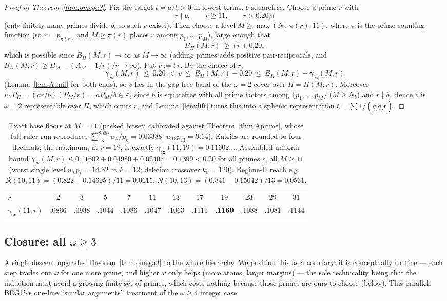 \documentclass[11pt]{amsart}
\theoremstyle{plain}
\theoremstyle{definition}
\newcommand{\Z}{\mathbb{Z}}
\begin{document}
\begin{proof}[Proof of Theorem~\ref{thm:omega3}]
Fix the target $t=a/b>0$ in lowest terms, $b$ squarefree.  Choose a prime $r$ with
\[
  r\nmid b,\qquad r\ge11,\qquad r>0.20/t
\]
(only finitely many primes divide $b$, so such $r$ exists).  Then choose a level
$M\ge\max(N_b,\pi(r),11)$, where $\pi$ is the prime-counting function (so
$r=p_{\pi(r)}$ and $M\ge\pi(r)$ places $r$ among $p_1,\dots,p_M$), large enough that
\[
  B_\Pi(M,r)\ \ge\ t\,r+0.20 ,
\]
which is possible since $B_\Pi(M,r)\to\infty$ as $M\to\infty$ (adding primes adds
positive pair-reciprocals, and $B_\Pi(M,r)\ge B_M-(A_M-1/r)/r\to\infty$).  Put
$v:=t\,r$.  By the choice of $r$,
\[
  \gamma_{\mathrm{ex}}(M,r)\ \le\ 0.20\ <\ v\ \le\ B_\Pi(M,r)-0.20
  \ \le\ B_\Pi(M,r)-\gamma_{\mathrm{ex}}(M,r)
\]
(Lemma~\ref{lem:Aunif} for both ends), so $v$ lies in the gap-free band of the
$\omega=2$ cover over $\Pi=\Pi(M,r)$.  Moreover $v\cdot P_\Pi=(ar/b)(P_M/r)
=aP_M/b\in\Z$, since $b$ is squarefree with all prime factors among
$\{p_1,\dots,p_M\}$ ($M\ge N_b$) and $r\nmid b$.  Hence $v$ is $\omega=2$
representable over $\Pi$, which omits $r$, and Lemma~\ref{lem:lift} turns this
into a sphenic representation $t=\sum1/(q_iq_jr)$.
\end{proof}

\begin{table}[h]
\centering
\small
\begin{tabular}{l|ccccccccccc}
\hline
$r$ & $2$ & $3$ & $5$ & $7$ & $11$ & $13$ & $17$ & $19$ & $23$ & $29$ & $31$\\
$\gamma_{\mathrm{ex}}(11,r)$ & .0866 & .0938 & .1044 & .1086 & .1047 & .1063 & .1111 & \textbf{.1160} & .1088 & .1081 & .1144\\
\hline
\end{tabular}
\caption{Exact base floors at $M=11$ (packed bitset; calibrated against
Theorem~\ref{thm:Aprime}, whose full-ruler run reproduces
$\sum_{13}^{2000}w_k/p_k=0.03388$, $w_{13}p_{13}=9.14$).  Entries are rounded to
four decimals; the maximum, at $r=19$, is exactly
$\gamma_{\mathrm{ex}}(11,19)=0.11602\ldots$.  Assembled uniform bound
$\gamma_{\mathrm{ex}}(M,r)\le0.11602+0.04980+0.02407=0.1899<0.20$ for all primes
$r$, all $M\ge11$ (worst single level $w_kp_k=14.32$ at $k=12$; deletion crossover
$k_0=120$).  Regime-II reach e.g.\ $\mathcal{R}(10,11)=(0.822-0.14605)/11=0.0615$,
$\mathcal{R}(10,13)=(0.841-0.15042)/13=0.0531$.}
\label{tab:omega3}
\end{table}

\subsection{Closure: all $\omega\ge3$}
A single descent upgrades Theorem~\ref{thm:omega3} to the whole hierarchy.  We
position this as a corollary: it is conceptually routine --- each step trades one
$\omega$ for one more prime, and higher $\omega$ only helps (more atoms, larger
margins) --- the sole technicality being that the induction must avoid a growing
finite set of primes, which costs nothing because those primes are ours to choose
(below).  This parallels BEG15's one-line ``similar arguments'' treatment of the
$\omega\ge4$ integer case.
\end{document}
